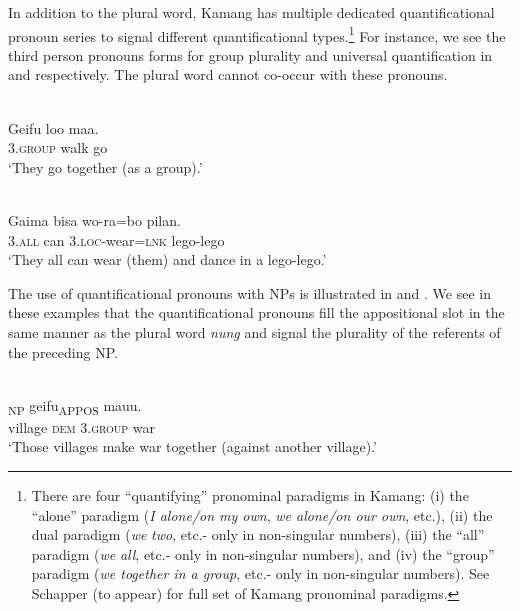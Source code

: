 In addition to the plural word, Kamang has multiple dedicated quantificational pronoun series to signal different quantificational types.\footnote{  There are four ``quantifying'' pronominal paradigms in Kamang: (i) the ``alone'' paradigm (\textit{I alone/on my own}, \textit{we alone/on our own}, etc.), (ii) the dual paradigm (\textit{we} \textit{two}, etc.- only in non-singular numbers), (iii) the ``all'' paradigm (\textit{we} \textit{all}, etc.- only in non-singular numbers), and (iv) the ``group'' paradigm (\textit{we together in a group}, etc.- only in non-singular numbers). See Schapper (to appear) for full set of Kamang pronominal paradigms.} For instance, we see the third person pronouns forms for group plurality and universal quantification in  and  respectively. The plural word cannot co-occur with these pronouns.


\ea%
 \\
\label{ex:9:40}
\gll  Geifu   loo maa.  \\
  3.\textsc{group} walk go   \\
\glt `They go together (as a group).'
\z






\ea%
\label{ex:9:41}
 \\
\gll Gaima bisa wo-ra=bo pilan. \\
  3.\textsc{all} can   3.\textsc{loc}-wear=\textsc{lnk} lego-lego  \\
\glt `They all can wear (them) and dance in a lego-lego.'
\z






The use of quantificational pronouns with NPs is illustrated in  and . We see in these examples that the quantificational pronouns fill the appositional slot in the same manner as the plural word \textit{nung} and signal the plurality of the referents of the preceding NP.


\ea%
\label{ex:9:42}
 \\
\textsubscript{NP} {geifu}\textsubscript{APPOS}   {mauu.}\\
  village \textsc{dem} 3.\textsc{group} war  \\
\glt `Those villages make war together (against another village).'
\z






